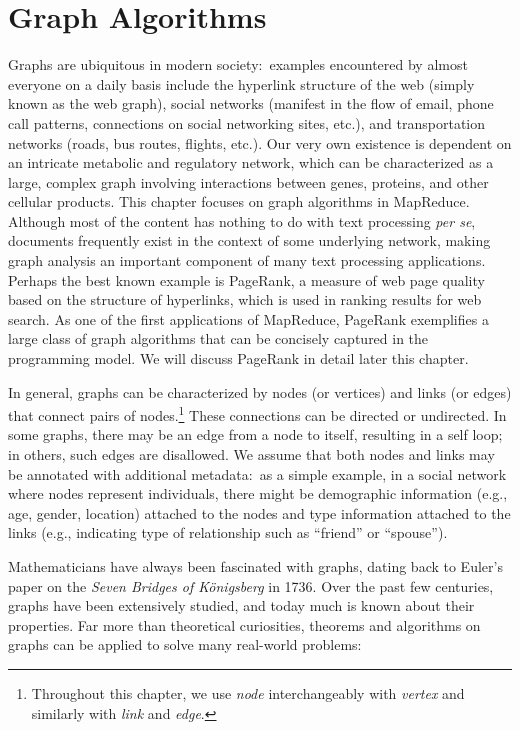 \chapter{Graph Algorithms}
\label{chapter-graphs}

Graphs are ubiquitous in modern society:\ examples encountered by
almost everyone on a daily basis include the hyperlink structure of
the web (simply known as the web graph), social networks (manifest in
the flow of email, phone call patterns, connections on social
networking sites, etc.), and transportation networks (roads, bus
routes, flights, etc.).  Our very own existence is dependent on an
intricate metabolic and regulatory network, which can be characterized
as a large, complex graph involving interactions between genes,
proteins, and other cellular products.  This chapter focuses on graph
algorithms in MapReduce.  Although most of the content has nothing to
do with text processing {\it per se}, documents frequently exist in
the context of some underlying network, making graph analysis an
important component of many text processing applications.  Perhaps the
best known example is PageRank, a measure of web page quality based on
the structure of hyperlinks, which is used in ranking results for web
search.  As one of the first applications of MapReduce, PageRank
exemplifies a large class of graph algorithms that can be concisely
captured in the programming model.  We will discuss PageRank in detail
later this chapter.

In general, graphs can be characterized by nodes (or vertices) and
links (or edges) that connect pairs of nodes.\footnote{Throughout this
  chapter, we use {\it node} interchangeably with {\it vertex} and
  similarly with {\it link} and {\it edge}.}  These connections can be
directed or undirected.  In some graphs, there may be an edge from a
node to itself, resulting in a self loop; in others, such edges are
disallowed.  We assume that both nodes and links may be annotated with
additional metadata:\ as a simple example, in a social network where
nodes represent individuals, there might be demographic information
(e.g., age, gender, location) attached to the nodes and type
information attached to the links (e.g., indicating type of
relationship such as ``friend'' or ``spouse'').

Mathematicians have always been fascinated with graphs, dating back to
Euler's paper on the {\it Seven Bridges of K\"{o}nigsberg} in 1736.
Over the past few centuries, graphs have been extensively studied, and
today much is known about their properties.  Far more than theoretical
curiosities, theorems and algorithms on graphs can be applied to solve
many real-world problems:

